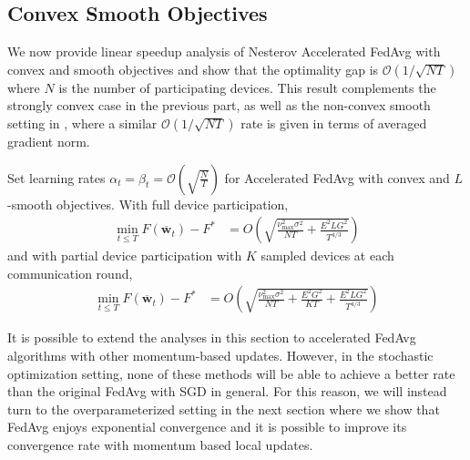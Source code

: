\subsection{Convex Smooth Objectives}

We now provide linear speedup analysis of Nesterov Accelerated FedAvg
with convex and smooth objectives and show that the optimality gap
is $\mathcal{O}(1/\sqrt{NT})$ where $N$ is the number of participating
devices. This result complements the strongly convex case in the previous
part, as well as the non-convex smooth setting in \cite{huo2020faster,yu2019linear,li2018federated},
where a similar $\mathcal{O}(1/\sqrt{NT})$ rate is given in terms
of averaged gradient norm. 
\begin{theorem}
	Set learning rates $\alpha_{t}=\beta_{t}=\mathcal{O}(\sqrt{\frac{N}{T}})$
	for Accelerated FedAvg with convex and $L$-smooth objectives. With
	full device participation, 
	\begin{align*}
	\min_{t\leq T}F(\overline{\mathbf{w}}_{t})-F^{\ast} & =O(\sqrt{\frac{\nu_{\max}^{2}\sigma^{2}}{NT}+\frac{E^{2}LG^{2}}{T^{4/3}}})
	\end{align*}
	and with partial device participation with $K$ sampled devices at
	each communication round, 
	\begin{align*}
	\min_{t\leq T}F(\overline{\mathbf{w}}_{t})-F^{\ast} & =O(\sqrt{\frac{\nu_{\max}^{2}\sigma^{2}}{NT}+\frac{E^{2}G^{2}}{KT}+\frac{E^{2}LG^{2}}{T^{4/3}}})
	\end{align*}
\end{theorem}
%
\begin{remark}
	It is possible to extend the analyses in this section to accelerated
	FedAvg algorithms with other momentum-based updates. However, in the
	stochastic optimization setting, none of these methods will be able
	to achieve a better rate than the original FedAvg with SGD in general.
	For this reason, we will instead turn to the overparameterized setting
	\cite{ma2017power,liu2018accelerating,canziani2016analysis} in the
	next section where we show that FedAvg enjoys exponential convergence
	and it is possible to improve its convergence rate with momentum based
	local updates. 
\end{remark}